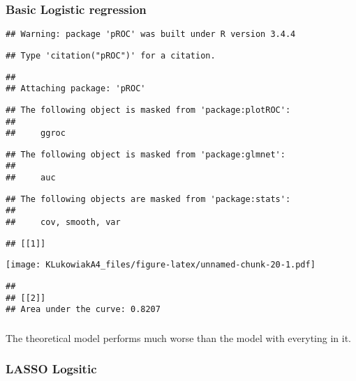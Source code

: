 \documentclass[]{article}
\begin{document}
\hypertarget{basic-logistic-regression}{%
\subsubsection{Basic Logistic
regression}\label{basic-logistic-regression}}

\begin{verbatim}
## Warning: package 'pROC' was built under R version 3.4.4
\end{verbatim}

\begin{verbatim}
## Type 'citation("pROC")' for a citation.
\end{verbatim}

\begin{verbatim}
## 
## Attaching package: 'pROC'
\end{verbatim}

\begin{verbatim}
## The following object is masked from 'package:plotROC':
## 
##     ggroc
\end{verbatim}

\begin{verbatim}
## The following object is masked from 'package:glmnet':
## 
##     auc
\end{verbatim}

\begin{verbatim}
## The following objects are masked from 'package:stats':
## 
##     cov, smooth, var
\end{verbatim}

\begin{verbatim}
## [[1]]
\end{verbatim}

\texttt{[image: KLukowiakA4\_files/figure-latex/unnamed-chunk-20-1.pdf]}

\begin{verbatim}
## 
## [[2]]
## Area under the curve: 0.8207
\end{verbatim}

\hypertarget{section}{%
\subsubsection{}\label{section}}

The theoretical model performs much worse than the model with everyting
in it.

\hypertarget{lasso-logsitic}{%
\subsubsection{LASSO Logsitic}\label{lasso-logsitic}}
\end{document}
